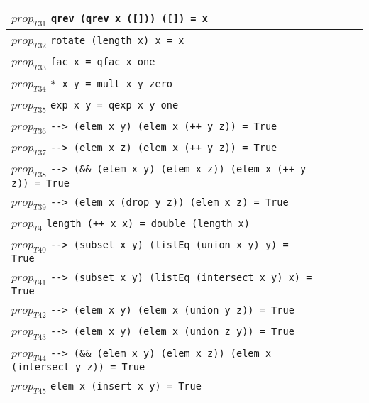 \documentclass{article}
\begin{document}
\begin{longtable}{p{10cm} || c | c | c | c | }
\hline
$prop_{T31}$ \newline \verb`qrev (qrev x ([])) ([]) = x` &  &  &  &  \\
\hline
$prop_{T32}$ \newline \verb`rotate (length x) x = x` &  &  &  &  \\
\hline
$prop_{T33}$ \newline \verb`fac x = qfac x one` &  &  &  &  \\
\hline
$prop_{T34}$ \newline \verb`* x y = mult x y zero` &  &  &  &  \\
\hline
$prop_{T35}$ \newline \verb`exp x y = qexp x y one` &  &  &  &  \\
\hline
$prop_{T36}$ \newline \verb`--> (elem x y) (elem x (++ y z)) = True` &  &  &  &  \\
\hline
$prop_{T37}$ \newline \verb`--> (elem x z) (elem x (++ y z)) = True` &  &  &  &  \\
\hline
$prop_{T38}$ \newline \verb`--> (&& (elem x y) (elem x z)) (elem x (++ y z)) = True` &  &  &  &  \\
\hline
$prop_{T39}$ \newline \verb`--> (elem x (drop y z)) (elem x z) = True` &  &  &  &  \\
\hline
$prop_{T4}$ \newline \verb`length (++ x x) = double (length x)` &  &  &  &  \\
\hline
$prop_{T40}$ \newline \verb`--> (subset x y) (listEq (union x y) y) = True` &  &  &  &  \\
\hline
$prop_{T41}$ \newline \verb`--> (subset x y) (listEq (intersect x y) x) = True` &  &  &  &  \\
\hline
$prop_{T42}$ \newline \verb`--> (elem x y) (elem x (union y z)) = True` &  &  &  &  \\
\hline
$prop_{T43}$ \newline \verb`--> (elem x y) (elem x (union z y)) = True` &  &  &  &  \\
\hline
$prop_{T44}$ \newline \verb`--> (&& (elem x y) (elem x z)) (elem x (intersect y z)) = True` &  &  &  &  \\
\hline
$prop_{T45}$ \newline \verb`elem x (insert x y) = True` &  &  &  &  \\

\end{longtable}
\end{document}
